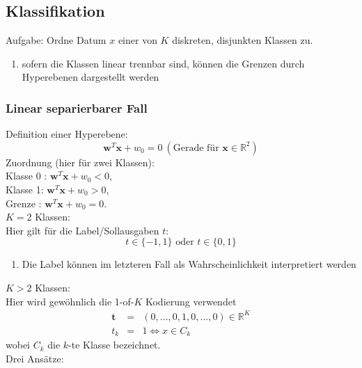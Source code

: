 	\subsection{Klassifikation}
	Aufgabe: Ordne Datum $x$ einer von $K$ diskreten, disjunkten Klassen zu.\vspace*{-5pt}
	\begin{enumerate}[$\hookrightarrow$]
		\item sofern die Klassen linear trennbar sind, können die Grenzen durch Hyperebenen dargestellt werden
	\end{enumerate}
	\subsubsection{Linear separierbarer Fall}
	Definition einer Hyperebene:
	\begin{equation*}
		\pmb{w}^T\pmb{x} +w_0 = 0 ~(\text{Gerade für } \pmb{x} \in \mathbb{R}^2)
	\end{equation*}
	Zuordnung (hier für zwei Klassen):\\[5pt]
	Klasse 0 : $\pmb{w}^T\pmb{x} +w_0 < 0$,\\
	Klasse 1: $\pmb{w}^T\pmb{x} +w_0 > 0$, \\
	Grenze : $\pmb{w}^T\pmb{x} +w_0 = 0$.\\[5pt]
	$K = 2$ Klassen:\\[5pt]
	Hier gilt für die Label/Sollausgaben $t$:
	\begin{equation*}
		t \in \{-1, 1\} \text{ oder } t \in \{0, 1\}
	\end{equation*}\vspace*{-5pt}
	\begin{enumerate}[$\hookrightarrow$]
		\item Die Label können im letzteren Fall als Wahrscheinlichkeit interpretiert werden
	\end{enumerate}
	$K > 2$  Klassen:\\[5pt]
	Hier wird gewöhnlich die 1-of-$K$ Kodierung verwendet
	\begin{eqnarray*}
		\pmb{t} &=& (0,...,0,1,0,...,0) \in \mathbb{R}^K\\
		t_k &=& 1 \Leftrightarrow x \in C_k
	\end{eqnarray*}
	wobei $C_k$ die $k$-te Klasse bezeichnet.\\[5pt]
	Drei Ansätze:
